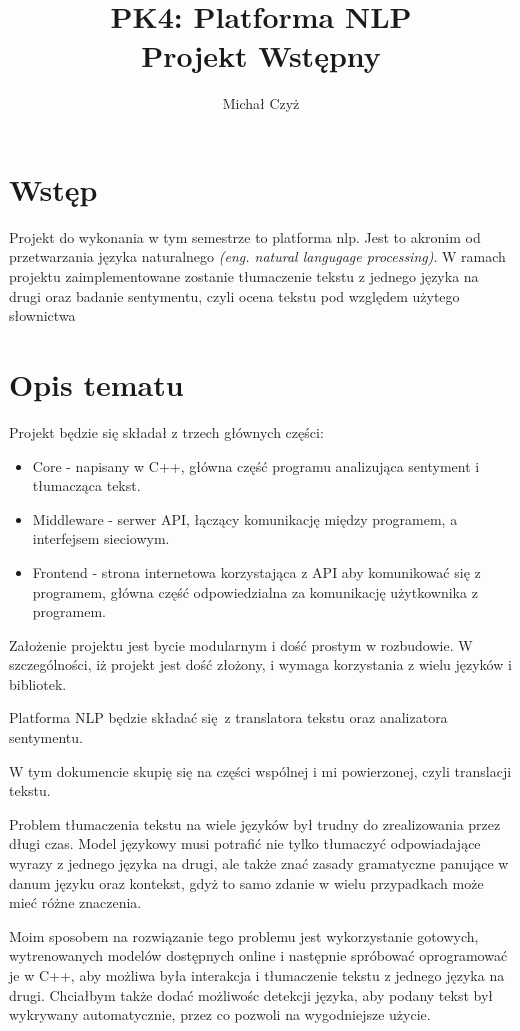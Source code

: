\documentclass{article}
\title{%
  PK4: Platforma NLP \\
  \large Projekt Wstępny}
\author{Michał Czyż}
\begin{document}
\maketitle

\section{Wstęp}

Projekt do wykonania w tym semestrze to platforma nlp. Jest to akronim od przetwarzania języka naturalnego \textit{(eng. natural langugage processing)}. W ramach projektu zaimplementowane zostanie tłumaczenie tekstu z jednego języka na drugi oraz badanie sentymentu, czyli ocena tekstu pod względem użytego słownictwa

\section{Opis tematu}

Projekt będzie się składał z trzech głównych części:

\begin{itemize}
  \item Core - napisany w C++, główna część programu analizująca sentyment i tłumacząca tekst.
  \item Middleware - serwer API, łączący komunikację między programem, a interfejsem sieciowym.
  \item Frontend - strona internetowa korzystająca z API aby komunikować się z programem, główna część odpowiedzialna za komunikację użytkownika z programem.
\end{itemize}

Założenie projektu jest bycie modularnym i dość prostym w rozbudowie. W szczególności, iż projekt jest dość złożony, i wymaga korzystania z wielu języków i bibliotek.

Platforma NLP będzie składać się z translatora tekstu oraz analizatora sentymentu. 

W tym dokumencie skupię się na części wspólnej i mi powierzonej, czyli translacji tekstu. 

Problem tłumaczenia tekstu na wiele języków był trudny do zrealizowania przez długi czas. Model językowy musi potrafić nie tylko tłumaczyć odpowiadające wyrazy z jednego języka na drugi, ale także znać zasady gramatyczne panujące w danum języku oraz kontekst, gdyż to samo zdanie w wielu przypadkach może mieć różne znaczenia. 

Moim sposobem na rozwiązanie tego problemu jest wykorzystanie gotowych, wytrenowanych modelów dostępnych online i następnie spróbować oprogramować je w C++, aby możliwa była interakcja i tłumaczenie tekstu z jednego języka na drugi. Chciałbym także dodać możliwośc detekcji języka, aby podany tekst był wykrywany automatycznie, przez co pozwoli na wygodniejsze użycie. 
\end{document}
